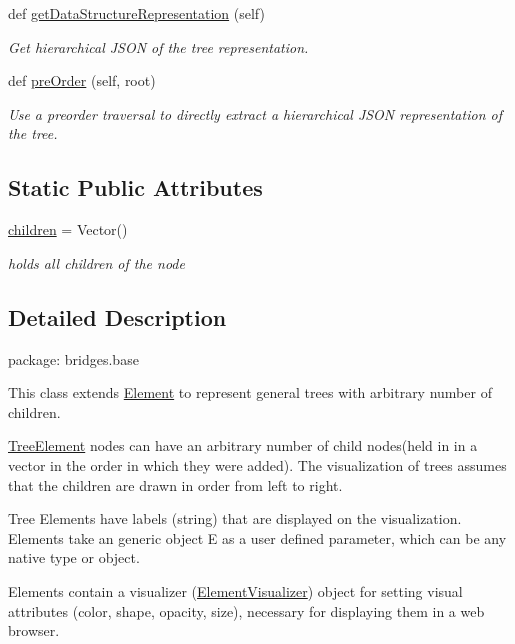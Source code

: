 \begin{DoxyCompactItemize}
def \hyperlink{class_tree_element_1_1_tree_element_a2353e72eb93c7f9d3670f3d790fbb78d}{get\+Data\+Structure\+Representation} (self)
\begin{DoxyCompactList}\small\item\em Get hierarchical J\+S\+ON of the tree representation. \end{DoxyCompactList}\item 
def \hyperlink{class_tree_element_1_1_tree_element_a748905d6bd1a29c0e1de3609781afa7c}{pre\+Order} (self, root)
\begin{DoxyCompactList}\small\item\em Use a preorder traversal to directly extract a hierarchical J\+S\+ON representation of the tree. \end{DoxyCompactList}\end{DoxyCompactItemize}
\subsection*{Static Public Attributes}
\begin{DoxyCompactItemize}
\item 
\hyperlink{class_tree_element_1_1_tree_element_aebd379cad696c2537f6a055f087b906a}{children} = Vector()
\begin{DoxyCompactList}\small\item\em holds all children of the node \end{DoxyCompactList}\end{DoxyCompactItemize}


\subsection{Detailed Description}
package\+: bridges.\+base 

This class extends \hyperlink{namespace_element}{Element} to represent general trees with arbitrary number of children.

\hyperlink{class_tree_element_1_1_tree_element}{Tree\+Element} nodes can have an arbitrary number of child nodes(held in in a vector in the order in which they were added). The visualization of trees assumes that the children are drawn in order from left to right.

Tree Elements have labels (string) that are displayed on the visualization. Elements take an generic object E as a user defined parameter, which can be any native type or object.

Elements contain a visualizer (\hyperlink{namespace_element_visualizer}{Element\+Visualizer}) object for setting visual attributes (color, shape, opacity, size), necessary for displaying them in a web browser.

